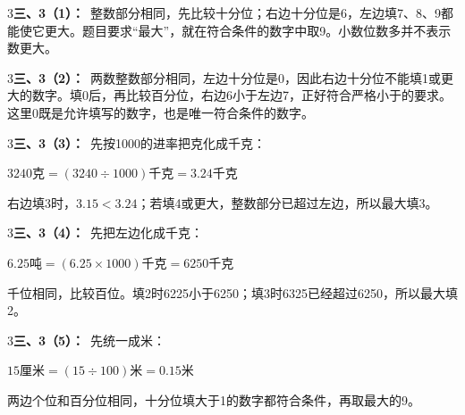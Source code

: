 \documentclass[multi=snippet,border={5bp 20bp 5bp 5bp}]{standalone}
\newenvironment{snippet}[3]{\begin{minipage}{#1bp}\color{answerred}\fontsize{#2}{#3}\selectfont\raggedright}{\end{minipage}}
\begin{document}
\begin{snippet}{505}{11.5}{14}\begin{multicols}{3}\raggedcolumns \textbf{三、3（1）：}\ 整数部分相同，先比较十分位；右边十分位是6，左边填7、8、9都能使它更大。题目要求“最大”，就在符合条件的数字中取9。小数位数多并不表示数更大。\end{multicols}\end{snippet}
\begin{snippet}{505}{11.5}{14}\begin{multicols}{3}\raggedcolumns \textbf{三、3（2）：}\ 两数整数部分相同，左边十分位是0，因此右边十分位不能填1或更大的数字。填0后，再比较百分位，右边6小于左边7，正好符合严格小于的要求。这里0既是允许填写的数字，也是唯一符合条件的数字。\end{multicols}\end{snippet}
\begin{snippet}{505}{11.5}{14}\begin{multicols}{3}\raggedcolumns \textbf{三、3（3）：}\ 先按1000的进率把克化成千克：\par\noindent\(\displaystyle 3240\text{克}=(3240\div1000)\text{千克}=3.24\text{千克}\)\allowbreak \par 右边填3时，\(3.15<3.24\)\allowbreak ；若填4或更大，整数部分已超过左边，所以最大填3。\end{multicols}\end{snippet}
\begin{snippet}{505}{11.5}{14}\begin{multicols}{3}\raggedcolumns \textbf{三、3（4）：}\ 先把左边化成千克：\par\noindent\(\displaystyle 6.25\text{吨}=(6.25\times1000)\text{千克}=6250\text{千克}\)\allowbreak \par 千位相同，比较百位。填2时6225小于6250；填3时6325已经超过6250，所以最大填2。\end{multicols}\end{snippet}
\begin{snippet}{505}{11.5}{14}\begin{multicols}{3}\raggedcolumns \textbf{三、3（5）：}\ 先统一成米：\par\noindent\(\displaystyle 15\text{厘米}=(15\div100)\text{米}=0.15\text{米}\)\allowbreak \par 两边个位和百分位相同，十分位填大于1的数字都符合条件，再取最大的9。\end{multicols}\end{snippet}
\end{document}
